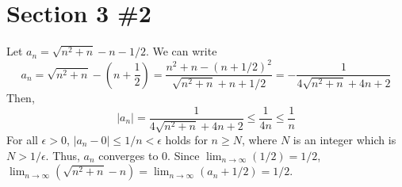 \documentclass{scrartcl}
\begin{document}
\section{Section 3 \#2}
Let \(a_n = \sqrt{n^2 + n} - n - 1 / 2\).
We can write
\[
  a_n = \sqrt{n^2 + n} - \left( n + \frac{1}{2} \right) = \frac{n^2 + n - (n + 1 / 2)^2}{\sqrt{n^2 + n} + n + 1/2} = -\frac{1}{4\sqrt{n^2 + n} + 4n + 2}
\]
Then,
\[
  |a_n| = \frac{1}{4\sqrt{n^2 + n} + 4n + 2} \leq \frac{1}{4n} \leq \frac{1}{n}
\]
For all \(\epsilon > 0\), \(|a_n - 0| \leq 1 / n < \epsilon\) holds for \(n \geq N\), where \(N\) is an integer which is \(N > 1 / \epsilon\).
Thus, \(a_n\) converges to \(0\).
Since \(\lim_{n \to \infty} (1 / 2) = 1 / 2\), \(\lim_{n \to \infty} (\sqrt{n^2 + n} - n) = \lim_{n \to \infty} (a_n + 1 / 2) = 1 / 2\).
\end{document}
